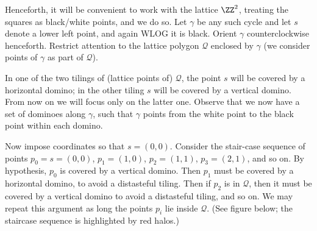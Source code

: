 \documentclass[11pt]{scrartcl}
\begin{document}
Henceforth, it will be convenient to work with the lattice $\ZZ^2$,
treating the squares as black/white points, and we do so.
Let $\gamma$ be any such cycle and let $s$ denote a
lower left point, and again WLOG it is black.
Orient $\gamma$ counterclockwise henceforth.
Restrict attention to the lattice polygon $\mathcal Q$ enclosed by $\gamma$
(we consider points of $\gamma$ as part of $\mathcal Q$).

In one of the two tilings of (lattice points of) $\mathcal Q$,
the point $s$ will be covered by a horizontal domino;
in the other tiling $s$ will be covered by a vertical domino.
From now on we will focus only on the latter one.
Observe that we now have a set of dominoes along $\gamma$,
such that $\gamma$ points from the white point to the black point
within each domino.

Now impose coordinates so that $s = (0,0)$.
Consider the stair-case sequence of points
$p_0 = s = (0,0)$, $p_1 = (1,0)$, $p_2 = (1,1)$, $p_3 = (2,1)$, and so on.
By hypothesis, $p_0$ is covered by a vertical domino.
Then $p_1$ must be covered by a horizontal domino, to avoid a distasteful tiling.
Then if $p_2$ is in $\mathcal Q$, then it must be covered by a vertical domino
to avoid a distasteful tiling, and so on.
We may repeat this argument as long the points $p_i$ lie inside $\mathcal Q$.
(See figure below; the staircase sequence is highlighted by red halos.)
\end{document}
